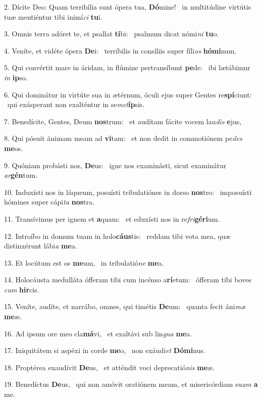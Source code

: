 2. Dícite Deo: Quam terribília sunt ópera tua, \textbf{Dó}mine! \ast\  in multitúdine virtútis tuæ mentiéntur tibi inimí\textit{ci} \textbf{tu}i.\

3. Omnis terra adóret te, et psallat \textbf{ti}bi: \ast\  psalmum dicat nómi\textit{ni} \textbf{tu}o.\

4. Veníte, et vidéte ópera \textbf{De}i: \ast\  terríbilis in consíliis super fíli\textit{os} \textbf{hó}\textbf{mi}num.\

5. Qui convértit mare in áridam, in flúmine pertransíbunt \textbf{pe}de: \ast\  ibi lætábimur \textit{in} \textbf{ip}so.\

6. Qui dominátur in virtúte sua in ætérnum, óculi ejus super Gentes re\textbf{spí}ciunt: \ast\  qui exásperant non exalténtur in se\textit{met}\textbf{íp}sis.\

7. Benedícite, Gentes, Deum \textbf{nos}trum: \ast\  et audítam fácite vocem lau\textit{dis} \textbf{e}jus,\

8. Qui pósuit ánimam meam ad \textbf{vi}tam: \ast\  et non dedit in commotiónem pe\textit{des} \textbf{me}os.\

9. Quóniam probásti nos, \textbf{De}us: \ast\  igne nos examinásti, sicut examinátur \textit{ar}\textbf{gén}tum.\

10. Induxísti nos in láqueum, posuísti tribulatiónes in dorso \textbf{nos}tro: \ast\  imposuísti hómines super cápi\textit{ta} \textbf{nos}tra.\

11. Transívimus per ignem et \textbf{a}quam: \ast\  et eduxísti nos in re\textit{fri}\textbf{gé}\textbf{ri}um.\

12. Introíbo in domum tuam in holo\textbf{cáus}tis: \ast\  reddam tibi vota mea, quæ distinxérunt lábi\textit{a} \textbf{me}a.\

13. Et locútum est os \textbf{me}um, \ast\  in tribulatió\textit{ne} \textbf{me}a.\

14. Holocáusta medulláta ófferam tibi cum incénso a\textbf{rí}etum: \ast\  ófferam tibi boves \textit{cum} \textbf{hir}cis.\

15. Veníte, audíte, et narrábo, omnes, qui timétis \textbf{De}um: \ast\  quanta fecit áni\textit{mæ} \textbf{me}æ.\

16. Ad ipsum ore meo cla\textbf{má}vi, \ast\  et exaltávi sub lin\textit{gua} \textbf{me}a.\

17. Iniquitátem si aspéxi in corde \textbf{me}o, \ast\  non exáudi\textit{et} \textbf{Dó}\textbf{mi}nus.\

18. Proptérea exaudívit \textbf{De}us, \ast\  et atténdit voci deprecatió\textit{nis} \textbf{me}æ.\

19. Benedíctus \textbf{De}us, \ast\  qui non amóvit oratiónem meam, et misericórdiam su\textit{am} \textbf{a} me.\

